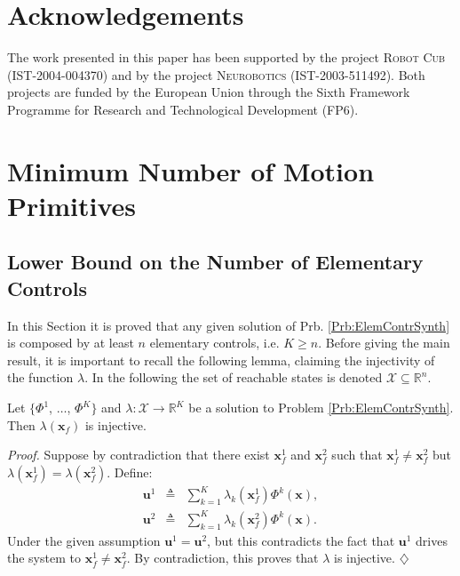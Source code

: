 \documentclass{svmult}
\newcommand{\x}{\mathbf {x}}
\newcommand{\ProofBegin}{{\em Proof.} }
\newcommand{\ProofEnd}{\hfill $\diamondsuit$\\}
\begin{document}
\section*{Acknowledgements}

The work presented in this paper has been supported by the project
\textsc{Robot Cub} (IST-2004-004370) and by the project
\textsc{Neurobotics} (IST-2003-511492). Both projects are funded by
the European Union through the Sixth Framework Programme for
Research and Technological Development (FP6).

\appendix

\section{Minimum Number of Motion Primitives} \label{Sec:MinNumPrimitives}

\subsection{Lower Bound on the Number of Elementary Controls} \label{Sec:LowerBound}

In this Section it is proved that any given solution of Prb.
\ref{Prb:ElemContrSynth} is composed by at least $n$
elementary controls, i.e. $K \geq n$. Before giving the main
result, it is important to recall the following lemma, claiming the 
injectivity of the function $\lambda$. In the following the set of reachable
states is denoted $\mathcal X \subseteq \mathbb R^n$.

\begin{lemma} \label{Lem:OneToOne}
Let $\{\Phi^1$, $\dots$, $\Phi^K\}$ and $\lambda : \mathcal X
\rightarrow \mathbb R^K$ be a solution to
Problem \ref{Prb:ElemContrSynth}. Then $\lambda(\x_f)$ is injective.
\end{lemma}

\ProofBegin Suppose by contradiction that there exist 
$\mathbf x_f^1$ and $\mathbf x_f^2$ such
that $\mathbf x_f^1 \neq \mathbf x_f^2$ but $\lambda(\mathbf
x_f^1) = \lambda(\mathbf x_f^2)$. Define:
\begin{eqnarray}
\mathbf u^1 & \triangleq & \sum_{k=1}^K \lambda_k(\mathbf
x_f^1) \Phi^k(\mathbf x), \\ \mathbf u^2 & \triangleq &
\sum_{k=1}^K \lambda_k(\mathbf x_f^2) \Phi^k(\mathbf x).
\end{eqnarray}
Under the given assumption $\mathbf u^1 = \mathbf u^2$, but this
contradicts the fact that $\mathbf u^1$ drives the system to 
$\mathbf x_f^1 \neq \mathbf x_f^2$. By contradiction, this proves 
that $\lambda$ is injective. \ProofEnd
\end{document}
